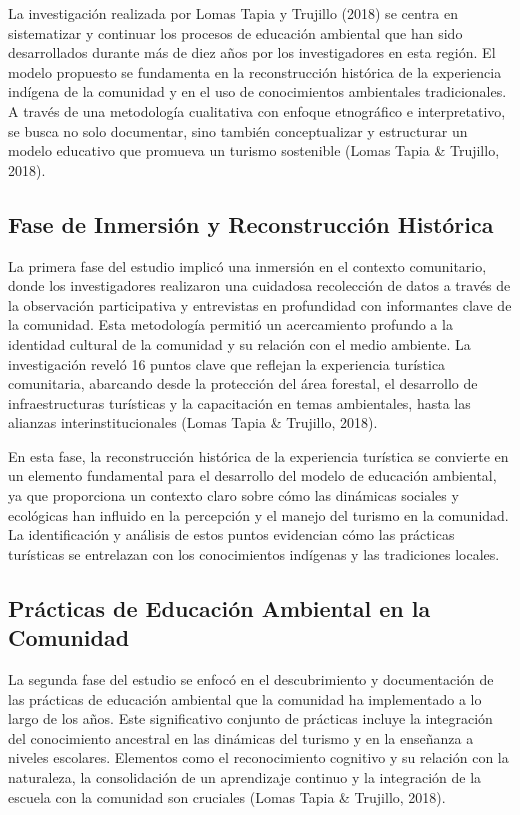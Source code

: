 \documentclass[
  letterpaper,
  DIV=11,
  numbers=noendperiod,
  oneside]{scrreprt}
\begin{document}
La investigación realizada por Lomas Tapia y Trujillo (2018) se centra
en sistematizar y continuar los procesos de educación ambiental que han
sido desarrollados durante más de diez años por los investigadores en
esta región. El modelo propuesto se fundamenta en la reconstrucción
histórica de la experiencia indígena de la comunidad y en el uso de
conocimientos ambientales tradicionales. A través de una metodología
cualitativa con enfoque etnográfico e interpretativo, se busca no solo
documentar, sino también conceptualizar y estructurar un modelo
educativo que promueva un turismo sostenible (Lomas Tapia \& Trujillo,
2018).

\subsection{Fase de Inmersión y Reconstrucción
Histórica}\label{fase-de-inmersiuxf3n-y-reconstrucciuxf3n-histuxf3rica}

La primera fase del estudio implicó una inmersión en el contexto
comunitario, donde los investigadores realizaron una cuidadosa
recolección de datos a través de la observación participativa y
entrevistas en profundidad con informantes clave de la comunidad. Esta
metodología permitió un acercamiento profundo a la identidad cultural de
la comunidad y su relación con el medio ambiente. La investigación
reveló 16 puntos clave que reflejan la experiencia turística
comunitaria, abarcando desde la protección del área forestal, el
desarrollo de infraestructuras turísticas y la capacitación en temas
ambientales, hasta las alianzas interinstitucionales (Lomas Tapia \&
Trujillo, 2018).

En esta fase, la reconstrucción histórica de la experiencia turística se
convierte en un elemento fundamental para el desarrollo del modelo de
educación ambiental, ya que proporciona un contexto claro sobre cómo las
dinámicas sociales y ecológicas han influido en la percepción y el
manejo del turismo en la comunidad. La identificación y análisis de
estos puntos evidencian cómo las prácticas turísticas se entrelazan con
los conocimientos indígenas y las tradiciones locales.

\subsection{Prácticas de Educación Ambiental en la
Comunidad}\label{pruxe1cticas-de-educaciuxf3n-ambiental-en-la-comunidad}

La segunda fase del estudio se enfocó en el descubrimiento y
documentación de las prácticas de educación ambiental que la comunidad
ha implementado a lo largo de los años. Este significativo conjunto de
prácticas incluye la integración del conocimiento ancestral en las
dinámicas del turismo y en la enseñanza a niveles escolares. Elementos
como el reconocimiento cognitivo y su relación con la naturaleza, la
consolidación de un aprendizaje continuo y la integración de la escuela
con la comunidad son cruciales (Lomas Tapia \& Trujillo, 2018).
\end{document}
